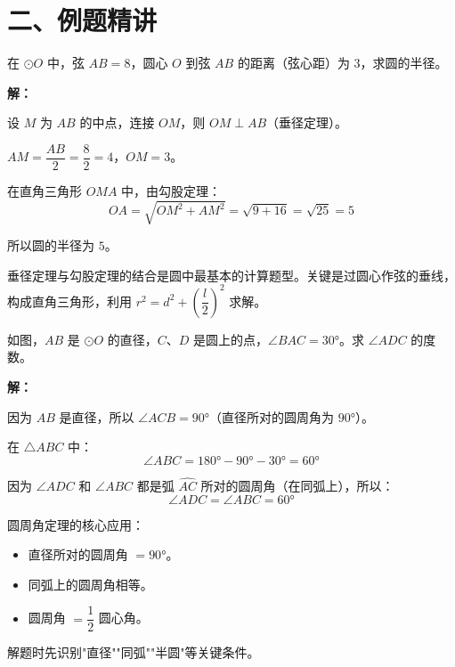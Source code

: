 \documentclass[12pt, a4paper]{ctexart}
\begin{document}
\section*{\textcolor{examorange}{二、例题精讲}}

\begin{examplebox}[【例题1】垂径定理的基本应用]
在 $\odot O$ 中，弦 $AB = 8$，圆心 $O$ 到弦 $AB$ 的距离（弦心距）为 $3$，求圆的半径。
\end{examplebox}

\textbf{解：}

设 $M$ 为 $AB$ 的中点，连接 $OM$，则 $OM \perp AB$（垂径定理）。

$AM = \dfrac{AB}{2} = \dfrac{8}{2} = 4$，$OM = 3$。

在直角三角形 $OMA$ 中，由勾股定理：
\[
OA = \sqrt{OM^2 + AM^2} = \sqrt{9 + 16} = \sqrt{25} = 5
\]

所以圆的半径为 $\boxed{5}$。

\begin{tipbox}[方法总结]
垂径定理与勾股定理的结合是圆中最基本的计算题型。关键是过圆心作弦的垂线，构成直角三角形，利用 $r^2 = d^2 + \left(\dfrac{l}{2}\right)^2$ 求解。
\end{tipbox}

\vspace{6pt}

\begin{examplebox}[【例题2】圆周角定理的应用]
如图，$AB$ 是 $\odot O$ 的直径，$C$、$D$ 是圆上的点，$\angle BAC = 30°$。求 $\angle ADC$ 的度数。
\end{examplebox}

\textbf{解：}

因为 $AB$ 是直径，所以 $\angle ACB = 90°$（直径所对的圆周角为 $90°$）。

在 $\triangle ABC$ 中：
\[
\angle ABC = 180° - 90° - 30° = 60°
\]

因为 $\angle ADC$ 和 $\angle ABC$ 都是弧 $\widehat{AC}$ 所对的圆周角（在同弧上），所以：
\[
\angle ADC = \angle ABC = 60°
\]

\begin{tipbox}[方法总结]
圆周角定理的核心应用：
\begin{itemize}[nosep]
  \item 直径所对的圆周角 $= 90°$。
  \item 同弧上的圆周角相等。
  \item 圆周角 $= \dfrac{1}{2}$ 圆心角。
\end{itemize}
解题时先识别"直径""同弧""半圆"等关键条件。
\end{tipbox}
\end{document}
